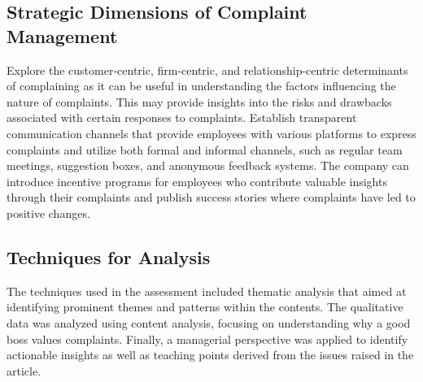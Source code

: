 \documentclass[a4paper,12pt]{article}
\begin{document}
\subsection{Strategic Dimensions of Complaint Management}
Explore the customer-centric, firm-centric, and relationship-centric determinants of complaining as it can be useful in understanding the factors influencing the nature of complaints. This may provide insights into the risks and drawbacks associated with certain responses to complaints\cite{opportunistic_complain}. Establish transparent communication channels that provide employees with various platforms to express complaints and utilize both formal and informal channels, such as regular team meetings, suggestion boxes, and anonymous feedback systems\cite{benefits_complain}. The company can introduce incentive programs for employees who contribute valuable insights through their complaints and publish success stories where complaints have led to positive changes.


\subsection{Techniques for Analysis}
The techniques used in the assessment included thematic analysis that aimed at identifying prominent themes and patterns within the contents. The qualitative data was analyzed using content analysis, focusing on understanding why a good boss values complaints. Finally, a managerial perspective was applied to identify actionable insights as well as teaching points derived from the issues raised in the article.

\newpage
\end{document}
